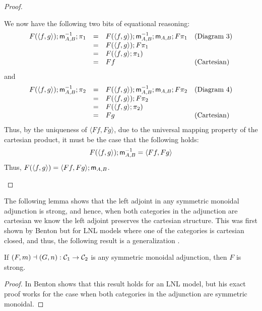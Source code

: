 \begin{proof}
\begin{itemize}
    We now have the following two bits of equational reasoning:
    \[
    \begin{array}{lllll}
      F(\langle f,g \rangle);\mathsf{m}_{A,B}^{-1};\pi_1
      & = & F(\langle f,g \rangle);\mathsf{m}_{A,B}^{-1};\mathsf{m}_{A,B};F\pi_1 & \text{(Diagram 3)}\\
      & = & F(\langle f,g \rangle);F\pi_1 & \text{}\\
      & = & F(\langle f,g \rangle;\pi_1) & \text{}\\
      & = & Ff & \text{(Cartesian)}\\
    \end{array}      
    \]
    and
    \[
    \begin{array}{lllll}
      F(\langle f,g \rangle);\mathsf{m}_{A,B}^{-1};\pi_2
      & = & F(\langle f,g \rangle);\mathsf{m}_{A,B}^{-1};\mathsf{m}_{A,B};F\pi_2 & \text{(Diagram 4)}\\
      & = & F(\langle f,g \rangle);F\pi_2 & \text{}\\
      & = & F(\langle f,g \rangle;\pi_2) & \text{}\\
      & = & Fg & \text{(Cartesian)}\\
    \end{array}      
    \]
    Thus, by the uniqueness of $\langle Ff,Fg \rangle$, due to the
    universal mapping property of the cartesian product, it must be
    the case that the following holds:
    \[
    F(\langle f,g \rangle);\mathsf{m}_{A,B}^{-1} = \langle Ff,Fg \rangle
    \]
    Thus, $F(\langle f,g \rangle) = \langle Ff,Fg \rangle;\mathsf{m}_{A,B}$.
  \end{itemize}  
\end{proof}
\fi

The following lemma shows that the left adjoint in any symmetric
monoidal adjunction is strong, and hence, when both categories in the
adjunction are cartesian we know the left adjoint preserves the
cartesian structure.  This was first shown by Benton but for LNL
models where one of the categories is cartesian closed, and thus, the
following result is a generalization \cite{benton1995}.

\begin{lemma}
  \label{lemma:product_functors_strong}
  If $(F,m) \dashv (G,n) : \cat{C}_1 \mto \cat{C}_2$ is any symmetric
  monoidal adjunction, then $F$ is strong.
\end{lemma}
\begin{proof}
  In \cite{benton1995} Benton shows that this result holds for an LNL
  model, but his exact proof works for the case when both categories
  in the adjunction are symmetric monoidal.  
\end{proof}

